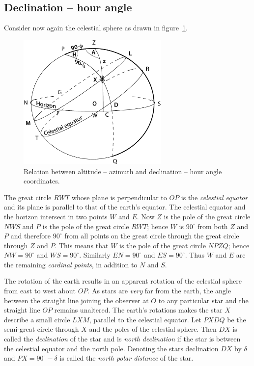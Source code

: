 \subsection{Declination -- hour angle}

Consider now again the celestial sphere as drawn in figure~\ref{fig:hr-dec}.

\begin{figure}[h]
\centering
\includegraphics[width=0.66\textwidth]{hr-dec.eps}
\caption{Relation between altitude -- azimuth and declination -- hour angle
coordinates.}
\label{fig:hr-dec}
\end{figure}

The great circle $RWT$ whose plane is perpendicular to $OP$ is the
{\it celestial equator} and its plane is parallel to that of the
earth's equator. The celestial equator and the horizon intersect in
two points $W$ and $E$. Now $Z$ is the pole of the great circle $NWS$
and $P$ is the pole of the great circle $RWT$; hence $W$ is $90^\circ$
from both $Z$ and $P$ and therefore $90^\circ$ from all points on the
great circle through the great circle through $Z$ and $P$. This means
that $W$ is the pole of the great circle $NPZQ$; hence $NW=90^\circ$
and $WS=90^\circ$. Similarly  $EN=90^\circ$ and  $ES=90^\circ$. Thus
$W$ and $E$ are the remaining {\it cardinal points}, in addition to
$N$ and $S$. 

The rotation of the earth results in an apparent rotation of the
celestial sphere from east to west about $OP$. As stars are {\it very}
far from the earth, the angle between the straight line joining the
observer at $O$ to any particular star and the straight line $OP$
remains unaltered. The earth's rotations makes the star $X$ describe a
small circle $LXM$, parallel to the celestial equator. Let $PXDQ$ be
the semi-great circle through $X$ and the poles of the celestial
sphere. Then $DX$ is called the {\it declination} of the star and is
{\it north declination} if the star is between the celestial equator and
the north pole. Denoting the stars declination $DX$ by $\delta$ and
$PX=90^\circ-\delta$ is called the {\it north polar distance} of the
star. 

